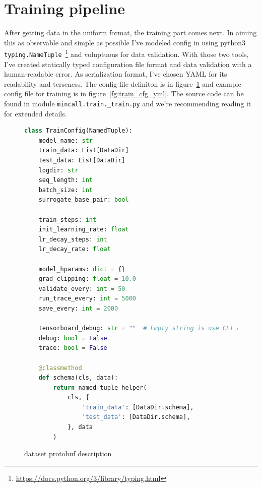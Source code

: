 \documentclass[times, utf8, diplomski, english]{fer}
\begin{document}

\section{Training pipeline}
After getting data in the uniform format, the training part comes next. In aiming this as observable and simple as possible I've modeled config in using python3 \texttt{typing.NameTuple}~\footnote{\url{https://docs.python.org/3/library/typing.html}} and voluptuous for data validation. 
With those two tools, I've created statically typed configuration file format and data validation with a human-readable error. As serialization format, I've chosen YAML for its readability and terseness. 
The config file definiton is in figure~\ref{fg:train_cfg_py} and example config file for training is in figure~\ref{fg:train_cfg_yml}. The source code can be found in module \texttt{mincall.train.\_train.py} and we're recommending reading it for extended details.

\begin{figure}
    \begin{center}
    \begin{lstlisting}[language=python,style=protobuf]
class TrainConfig(NamedTuple):
    model_name: str
    train_data: List[DataDir]
    test_data: List[DataDir]
    logdir: str
    seq_length: int
    batch_size: int
    surrogate_base_pair: bool

    train_steps: int
    init_learning_rate: float
    lr_decay_steps: int
    lr_decay_rate: float

    model_hparams: dict = {}
    grad_clipping: float = 10.0
    validate_every: int = 50
    run_trace_every: int = 5000
    save_every: int = 2000

    tensorboard_debug: str = ""  # Empty string is use CLI debug
    debug: bool = False
    trace: bool = False

    @classmethod
    def schema(cls, data):
        return named_tuple_helper(
            cls, {
                'train_data': [DataDir.schema],
                'test_data': [DataDir.schema],
            }, data
        )

    \end{lstlisting}
    \caption{dataset protobuf description}
    \label{fg:train_cfg_py}
    \end{center}
\end{figure}
\end{document}
